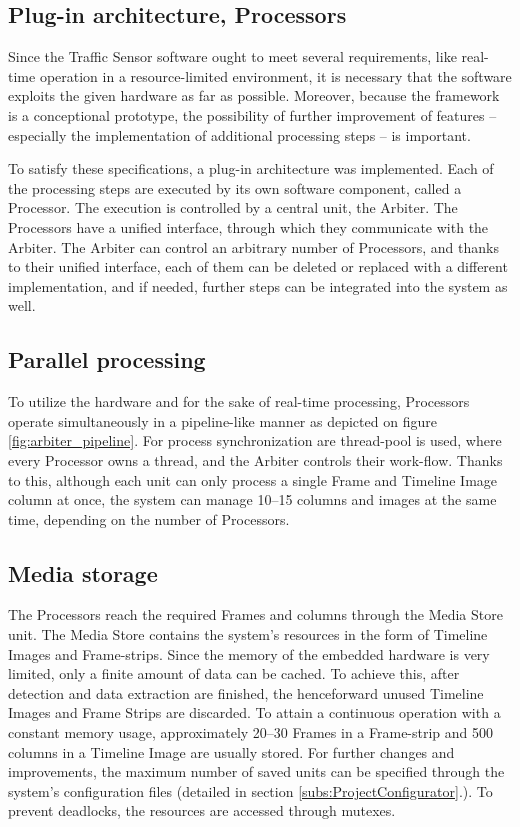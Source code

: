 \subsection{Plug-in architecture, Processors}
Since the Traffic Sensor software ought to meet several requirements, like real-time operation in a resource-limited environment, it is necessary that the software exploits the given hardware as far as possible.
Moreover, because the framework is a conceptional prototype, the possibility of further improvement of features -- especially the implementation of additional processing steps -- is important.

To satisfy these specifications, a plug-in architecture was implemented.
Each of the processing steps are executed by its own software component, called a Processor.
The execution is controlled by a central unit, the Arbiter.
The Processors have a unified interface, through which they communicate with the Arbiter.
The Arbiter can control an arbitrary number of Processors, and thanks to their unified interface, each of them can be deleted or replaced with a different implementation, and if needed, further steps can be integrated into the system as well.

\subsection{Parallel processing}
To utilize the hardware and for the sake of real-time processing, Processors operate simultaneously in a pipeline-like manner as depicted on figure \ref{fig:arbiter_pipeline}.
For process synchronization are thread-pool is used, where every Processor owns a thread, and the Arbiter controls their work-flow.
Thanks to this, although each unit can only process a single Frame and Timeline Image column at once, the system can manage 10--15 columns and images at the same time, depending on the number of Processors.

\subsection{Media storage}
The Processors reach the required Frames and columns through the Media Store unit.
The Media Store contains the system's resources in the form of Timeline Images and Frame-strips.
Since the memory of the embedded hardware is very limited, only a finite amount of data can be cached.
To achieve this, after detection and data extraction are finished, the henceforward unused Timeline Images and Frame Strips are discarded.
To attain a continuous operation with a constant memory usage, approximately 20--30 Frames in a Frame-strip and 500 columns in a Timeline Image are usually stored.
For further changes and improvements, the maximum number of saved units can be specified through the system's configuration files (detailed in section \ref{subs:ProjectConfigurator}.).
To prevent deadlocks, the resources are accessed through mutexes.

